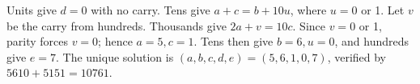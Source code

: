 Units give $d=0$ with no carry. Tens give $a+c=b+10u$, where $u=0$ or 1. Let $v$ be the carry from hundreds. Thousands give $2a+v=10c$. Since $v=0$ or 1, parity forces $v=0$; hence $a=5,c=1$. Tens then give $b=6,u=0$, and hundreds give $e=7$. The unique solution is $\boxed{(a,b,c,d,e)=(5,6,1,0,7)}$, verified by $5610+5151=10761$.
